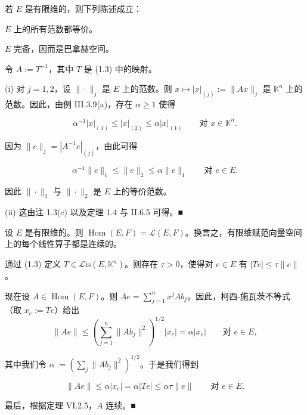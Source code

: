 \begin{corollary}

若 $ E $ 是有限维的，则下列陈述成立：

\begin{subitems}
\item

$ E $ 上的所有范数都等价。

\item

$ E $ 完备，因而是巴拿赫空间。

\proofhead
令 $ A := T^{-1} $，其中 $ T $ 是 (1.3) 中的映射。
\end{subitems}

(i) 对 $ j = 1, 2 $，设 $ \|\cdot\|_{j} $ 是 $ E $ 上的范数。则 $ x \mapsto |x|_{(j)} := \|Ax\|_{j} $ 是 $ \mathbb{K}^{n} $ 上的范数。因此，由例 III.3.9(a)，存在 $ \alpha \ge 1 $ 使得

\[
\alpha^{-1}|x|_{(1)} \le |x|_{(2)} \le \alpha|x|_{(1)} \qquad \text{对 } x \in \mathbb{K}^{n} .
\]

因为 $ \|e\|_{j} = |A^{-1}e|_{(j)} $，由此可得

\[
\alpha^{-1}\|e\|_{1} \le \|e\|_{2} \le \alpha\|e\|_{1} \qquad \text{对 } e \in E .
\]

因此 $ \|\cdot\|_{1} $ 与 $ \|\cdot\|_{2} $ 是 $ E $ 上的等价范数。

(ii) 这由注 1.3(c) 以及定理 1.4 与 II.6.5 可得。\nobreak\hspace{0.35em}■

\end{corollary}

\begin{theorem}

设 $ E $ 是有限维的。则 $ \operatorname{Hom}(E, F) = \mathcal{L}(E, F) $。换言之，有限维赋范向量空间上的每个线性算子都是连续的。

\proofhead
通过 (1.3) 定义 $ T \in \mathcal{L}\mathrm{is}(E, \mathbb{K}^{n}) $。则存在 $ \tau > 0 $，使得对 $ e \in E $ 有 $ |Te| \le \tau\|e\| $。

现在设 $ A \in \operatorname{Hom}(E, F) $。则 $ Ae = \sum_{j=1}^{n} x^{j}Ab_{j} $。因此，柯西-施瓦茨不等式（取 $ x_{e} := Te $）给出
\[
\|Ae\| \le \left( \sum_{j=1}^{n} \|Ab_{j}\|^{2} \right)^{1/2}|x_{e}| = \alpha|x_{e}| \qquad \text{对 } e \in E ,
\]

其中我们令 $ \alpha := \left( \sum_{j}\|Ab_{j}\|^{2} \right)^{1/2} $。于是我们得到

\[
\|Ae\| \le \alpha|x_{e}| = \alpha|Te| \le \alpha\tau\|e\| \qquad \text{对 } e \in E .
\]

最后，根据定理 VI.2.5，$ A $ 连续。\nobreak\hspace{0.35em}■

\end{theorem}

